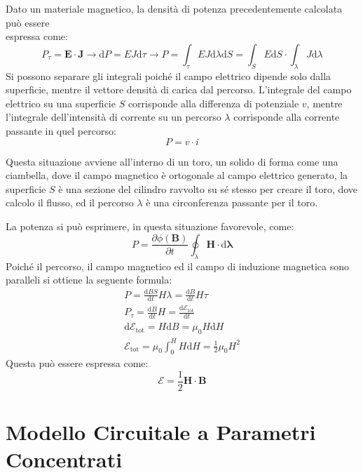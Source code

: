 \documentclass{article}
\newcommand{\vect}[1]{\boldsymbol{\mathbf{#1}}}
\newcommand{\df}{\mathrm{d}}
\numberwithin{equation}{subsection}
\begin{document}
Dato un materiale magnetico, la densità di potenza precedentemente calcolata può essere\\espressa come:
\begin{equation*}
    P_\tau=\vect{E}\cdot\vect{J}\to \df P=EJ\df\tau\to P=\displaystyle\int_{\tau}EJ\df\lambda \df S=\int_{S}E\df S\cdot\int_{\lambda}J\df\lambda
\end{equation*}
Si possono separare gli integrali poiché il campo elettrico dipende solo dalla superficie, mentre il vettore densità di carica dal percorso. L'integrale del campo elettrico 
su una superficie $S$ corrisponde alla differenza di potenziale $v$, mentre l'integrale dell'intensità di corrente su un percorso $\lambda$ corrisponde alla corrente passante 
in quel percorso: 
\begin{equation}
    P=v\cdot i
\end{equation}

Questa situazione avviene all'interno di un toro, un solido di forma come una ciambella, dove il campo magnetico è ortogonale al campo elettrico generato, la superficie $S$ 
è una sezione del cilindro ravvolto su sé stesso per creare il toro, dove calcolo il flusso, ed il percorso $\lambda$ è una circonferenza passante per il toro. 

La potenza si può esprimere, in questa situazione favorevole, come:
\begin{equation*}
    P=\displaystyle\frac{\partial \phi(\vect{B})}{\partial t}\oint_{\lambda}\vect{H}\cdot \df\vect{\lambda}
\end{equation*}
Poiché il percorso, il campo magnetico ed il campo di induzione magnetica sono paralleli si ottiene la seguente formula:
\begin{gather*}
    P=\displaystyle\frac{\df BS}{\df t}H\lambda=\frac{\df B}{\df t}H\tau\\
    P_{\tau}=\displaystyle\frac{\df B}{\df t}H=\frac{\df\mathscr{E}_\mathrm{tot}}{\df t}\\
    \df\mathscr{E}_\mathrm{tot}=H\df B=\mu_0H\df H\\
    \mathscr{E}_\mathrm{tot}=\displaystyle\mu_0\int_0^HH\df H=\frac{1}{2}\mu_0H^2
\end{gather*}
Questa può essere espressa come:
\begin{equation}
    \mathscr{E}=\displaystyle\frac{1}{2}\vect{H}\cdot\vect{B}
\end{equation}

\clearpage

\section{Modello Circuitale a Parametri Concentrati}
\end{document}
